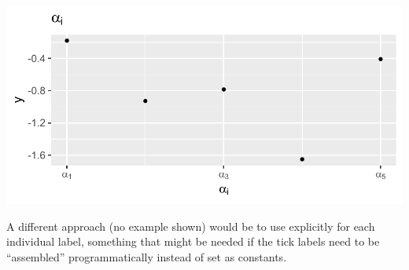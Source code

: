 \documentclass[krantz2]{krantz}\usepackage{knitr}
\begin{document}
\begin{knitrout}\footnotesize
{}\color{fgcolor}\begin{kframe}
\begin{alltt}
 \hlkwb{<-} 
  \hlopt{+}
   \hlstd{()} \hlopt{+}
   \hlstd{(} \hlstd{=} \hlstd{(}  \hlopt{+}
   \hlstd{(} \hlstd{=} 
                       \hlstd{=} \hlstd{(}\hlstd{,}\hlstd{,}\hlstd{),}
                       \hlstd{=} \hlstd{(alpha[}\hlstd{], alpha[}\hlstd{], alpha[}\hlstd{]))}
\end{alltt}
\end{kframe}

{\centering \includegraphics[width=.7\textwidth]{figure/pos-plotmath-02a-1}

}



\end{knitrout}

A different approach (no example shown) would be to use  explicitly for each individual label, something that might be needed if the tick labels need to be ``assembled'' programmatically instead of set as constants.
\end{document}
